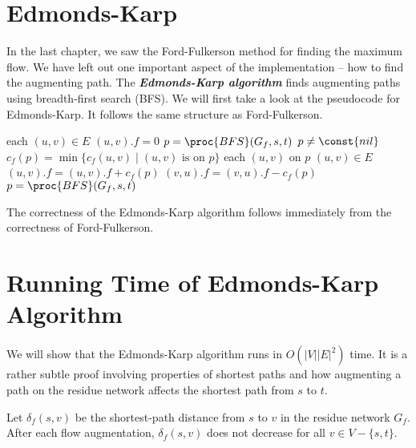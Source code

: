 \section{Edmonds-Karp}

In the last chapter, we saw the Ford-Fulkerson method for finding the maximum flow. We have left out one important aspect of the implementation -- how to find the augmenting path. The \textit{\textbf{Edmonds-Karp algorithm}} finds augmenting paths using breadth-first search (BFS). We will first take a look at the pseudocode for Edmonds-Karp. It follows the same structure as Ford-Fulkerson.

\begin{codebox}
    \li \For each $(u,v) \in E$ \Do
        \li $(u,v).f = 0$ 
    \End
    \li $p = \proc{BFS}(G_f, s, t)$ 
    \li \While $p \neq \const{nil}$ \Do
        \li $c_f(p) = \min \{c_f(u,v) \mid \text{$(u,v)$ is on $p$} \}$ 
        \li \For each $(u,v)$ on $p$ \Do {}
            \li \If $(u,v) \in E$ \Then
                \li $(u,v).f = (u,v).f + c_f(p)$
            \li \Else $(v,u).f = (v,u).f - c_f(p)$
            \End
        \End
        \li $p = \proc{BFS}(G_f,s,t)$ 
    \End
\end{codebox}

The correctness of the Edmonds-Karp algorithm follows immediately from the correctness of Ford-Fulkerson.

\section{Running Time of Edmonds-Karp Algorithm}

We will show that the Edmonds-Karp algorithm runs in $O(|V||E|^2)$ time. It is a rather subtle proof involving properties of shortest paths and how augmenting a path on the residue network affects the shortest path from $s$ to $t$.

\begin{lemma} \label{lem:edmondskarp-runtime-1}
    Let $\delta_f(s,v)$ be the shortest-path distance from $s$ to $v$ in the residue network $G_f$. After each flow augmentation, $\delta_f(s,v)$ does not decrease for all $v \in V - \{s,t\}$.
\end{lemma}

